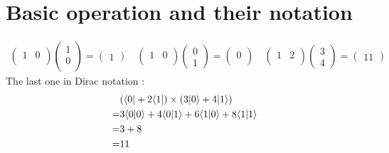 \section{Basic operation and their notation}


\begin{align*}
\left(\begin{array}{cccc}
 1 &0 \\
\end{array}\right)
\left(\begin{array}{c}
 1\\
 0 \\
\end{array}\right) =
\left(\begin{array}{c}
 1
\end{array}\right)
\quad
\left(\begin{array}{cccc}
 1 &0 \\
\end{array}\right)
\left(\begin{array}{c}
 0\\
 1
\end{array}\right) =
\left(\begin{array}{c}
 0\\
\end{array}\right)
\quad
\left(\begin{array}{cccc}
 1 &2 \\
\end{array}\right)
\left(\begin{array}{c}
 3\\
 4
\end{array}\right) =
\left(\begin{array}{c}
 11
\end{array}\right)
\end{align*}
The last one in Dirac notation :
\begin{align*}
  & (\langle 0 | + 2\langle 1 |) \times (3| 0 \rangle + 4 | 1 \rangle) \\
  =& 3\langle 0 | 0 \rangle + 4 \langle 0 | 1 \rangle + 6 \langle 1 | 0 \rangle + 8 \langle 1 | 1 \rangle \\
  =& 3 + 8 \\
  =& 11
\end{align*}
